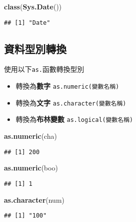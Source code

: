 \documentclass[]{book}
\newenvironment{Shaded}{\begin{snugshade}}{\end{snugshade}}
\newcommand{\KeywordTok}[1]{\textcolor[rgb]{0.13,0.29,0.53}{\textbf{{#1}}}}
\newcommand{\NormalTok}[1]{{#1}}
\providecommand{\tightlist}{%
  \setlength{\itemsep}{0pt}\setlength{\parskip}{0pt}}
\begin{document}
\begin{Shaded}
\begin{Highlighting}[]
\KeywordTok{class}\NormalTok{(}\KeywordTok{Sys.Date}\NormalTok{())}
\end{Highlighting}
\end{Shaded}

\begin{verbatim}
## [1] "Date"
\end{verbatim}

\subsection{資料型別轉換}

使用以下\texttt{as.}函數轉換型別

\begin{itemize}
\tightlist
\item
  轉換為\textbf{數字} \texttt{as.numeric(變數名稱)}
\item
  轉換為\textbf{文字} \texttt{as.character(變數名稱)}
\item
  轉換為\textbf{布林變數} \texttt{as.logical(變數名稱)}
\end{itemize}

\begin{Shaded}
\begin{Highlighting}[]
\KeywordTok{as.numeric}\NormalTok{(cha)}
\end{Highlighting}
\end{Shaded}

\begin{verbatim}
## [1] 200
\end{verbatim}

\begin{Shaded}
\begin{Highlighting}[]
\KeywordTok{as.numeric}\NormalTok{(boo)}
\end{Highlighting}
\end{Shaded}

\begin{verbatim}
## [1] 1
\end{verbatim}

\begin{Shaded}
\begin{Highlighting}[]
\KeywordTok{as.character}\NormalTok{(num)}
\end{Highlighting}
\end{Shaded}

\begin{verbatim}
## [1] "100"
\end{verbatim}
\end{document}
